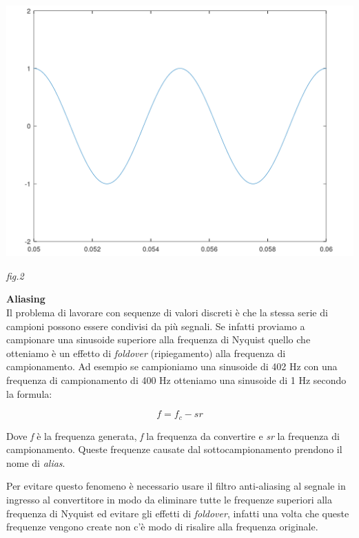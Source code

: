 \documentclass[11pt]{article}
\begin{document}
\begin{multicols*}{2}
\begin{center}
\begin{minipage}[c]{4cm}
\begin{sffamily}
\end{sffamily}
\end{minipage}
\end{center}

\begin{center}
\includegraphics[scale=0.2]{images/plot01.png}

{\scriptsize \emph{fig.2 }}
\end{center}


\textbf{\textsf {Aliasing}}\\

\noindent Il problema di lavorare con sequenze di valori discreti è che la stessa serie di campioni possono essere condivisi da più segnali. Se infatti proviamo a campionare una sinusoide superiore alla frequenza di Nyquist quello che otteniamo è un effetto di \textit {foldover} (ripiegamento) alla frequenza di campionamento. Ad esempio se campioniamo una sinusoide di 402 Hz con una frequenza di campionamento di 400 Hz otteniamo una sinusoide di 1 Hz secondo la formula:

\[
f = f_c -  sr
\]

\noindent Dove \textit {f} è la frequenza generata, \textit f la frequenza da convertire e \textit {sr} la frequenza di campionamento. Queste frequenze causate dal sottocampionamento prendono il nome di \textit {alias}. 

Per evitare questo fenomeno è necessario usare il filtro anti-aliasing al segnale in ingresso al convertitore in modo da eliminare tutte le frequenze superiori alla frequenza di Nyquist ed evitare gli effetti di \textit {foldover}, infatti una volta che queste frequenze vengono create non c'è modo di risalire alla frequenza originale.\newpage


\end{multicols*}
\end{document}
